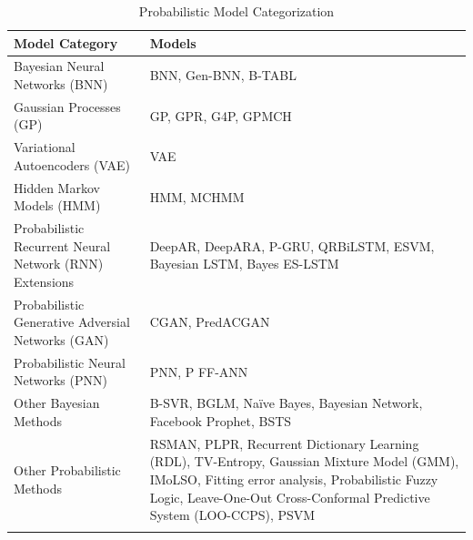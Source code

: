 \begin{table}[H]
    \centering
    \caption[Model Categorization]{Probabilistic Model Categorization}
    \label{table:model_categorization}
    \small
    \begin{adjustbox}{width=0.5\textwidth,center}
    \begin{tabular}{p{}p{}}
        \toprule
        \textbf{Model Category} & \textbf{Models} \\
        \midrule
        Bayesian Neural Networks (BNN) & BNN, Gen-BNN, B-TABL \\
        \addlinespace
        \hdashline[0.2pt/3pt]
        \addlinespace
        Gaussian Processes (GP) & GP, GPR, G4P, GPMCH \\
        \addlinespace
        \hdashline[0.2pt/3pt]
        \addlinespace
        Variational Autoencoders (VAE) & VAE \\
        \addlinespace
        \hdashline[0.2pt/3pt]
        \addlinespace
        Hidden Markov Models (HMM) & HMM, MCHMM \\
        \addlinespace
        \hdashline[0.2pt/3pt]
        \addlinespace
        Probabilistic Recurrent Neural Network (RNN) Extensions & DeepAR, DeepARA, P-GRU, QRBiLSTM, ESVM, Bayesian LSTM, Bayes ES-LSTM \\
        \addlinespace
        \hdashline[0.2pt/3pt]
        \addlinespace
        Probabilistic Generative Adversial Networks (GAN) & CGAN, PredACGAN \\
        \addlinespace
        \hdashline[0.2pt/3pt]
        \addlinespace
        Probabilistic Neural Networks (PNN) & PNN, P FF-ANN \\
        \addlinespace
        \hdashline[0.2pt/3pt]
        \addlinespace
        Other Bayesian Methods & B-SVR, BGLM, Naïve Bayes, Bayesian Network, Facebook Prophet, BSTS \\
        \addlinespace
        \hdashline[0.2pt/3pt]
        \addlinespace
        Other Probabilistic Methods & RSMAN, PLPR, Recurrent Dictionary Learning (RDL), TV-Entropy, Gaussian Mixture Model (GMM), IMoLSO, Fitting error analysis, Probabilistic Fuzzy Logic, Leave-One-Out Cross-Conformal Predictive System (LOO-CCPS), PSVM  \\
        \addlinespace
        \addlinespace
        \bottomrule
    \end{tabular}
    \end{adjustbox}
\end{table}

